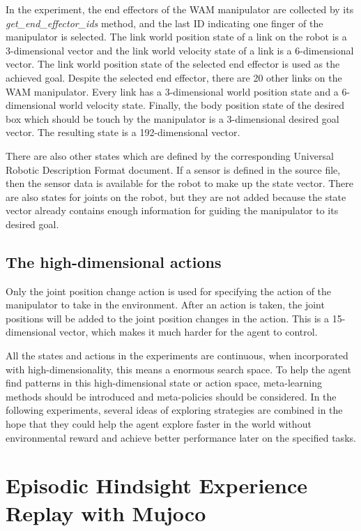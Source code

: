 \documentclass[a4paper, 12pt]{report}
\begin{document}
    In the experiment, the end effectors of the WAM manipulator are collected by its \emph{get\_end\_effector\_ids} method, and the last ID indicating one finger of the manipulator is selected. The link world position state of a link on the robot is a 3-dimensional vector and the link world velocity state of a link is a 6-dimensional vector. The link world position state of the selected end effector is used as the achieved goal. Despite the selected end effector, there are 20 other links on the WAM manipulator. Every link has a 3-dimensional world position state and a 6-dimensional world velocity state. Finally, the body position state of the desired box which should be touch by the manipulator is a 3-dimensional desired goal vector. The resulting state is a 192-dimensional vector.

    There are also other states which are defined by the corresponding Universal Robotic Description Format document. If a sensor is defined in the source file, then the sensor data is available for the robot to make up the state vector. There are also states for joints on the robot, but they are not added because the state vector already contains enough information for guiding the manipulator to its desired goal.
    
    \section {The high-dimensional actions}

    Only the joint position change action is used for specifying the action of the manipulator to take in the environment. After an action is taken, the joint positions will be added to the joint position changes in the action. This is a 15-dimensional vector, which makes it much harder for the agent to control.

    All the states and actions in the experiments are continuous, when incorporated with high-dimensionality, this means a enormous search space. To help the agent find patterns in this high-dimensional state or action space, meta-learning methods should be introduced and meta-policies should be considered. In the following experiments, several ideas of exploring strategies are combined in the hope that they could help the agent explore faster in the world without environmental reward and achieve better performance later on the specified tasks.
    
\chapter {Episodic Hindsight Experience Replay with Mujoco}
\end{document}
